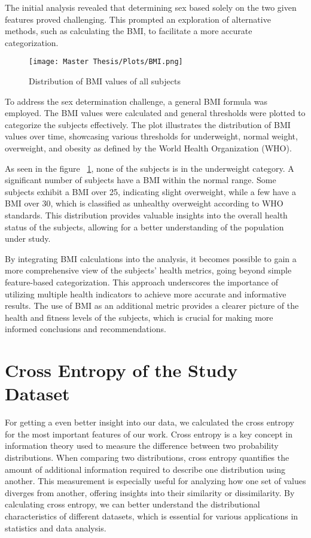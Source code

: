 The initial analysis revealed that determining sex based solely on the two given features proved challenging. This prompted an exploration of alternative methods, such as calculating the BMI, to facilitate a more accurate categorization.

\FloatBarrier
\begin{figure}[h!]
\centering
\texttt{[image: Master Thesis/Plots/BMI.png]}
\caption{Distribution of BMI values of all subjects}
\label{fig:distBMI}
\end{figure}
\FloatBarrier

To address the sex determination challenge, a general BMI formula was employed. The BMI values were calculated and general thresholds were plotted to categorize the subjects effectively. The plot illustrates the distribution of BMI values over time, showcasing various thresholds for underweight, normal weight, overweight, and obesity as defined by the World Health Organization (WHO).

As seen in the figure ~\ref{fig:distBMI}, none of the subjects is in the underweight category. A significant number of subjects have a BMI within the normal range. Some subjects exhibit a BMI over 25, indicating slight overweight, while a few have a BMI over 30, which is classified as unhealthy overweight according to WHO standards. This distribution provides valuable insights into the overall health status of the subjects, allowing for a better understanding of the population under study.

By integrating BMI calculations into the analysis, it becomes possible to gain a more comprehensive view of the subjects' health metrics, going beyond simple feature-based categorization. This approach underscores the importance of utilizing multiple health indicators to achieve more accurate and informative results. The use of BMI as an additional metric provides a clearer picture of the health and fitness levels of the subjects, which is crucial for making more informed conclusions and recommendations.

\section{Cross Entropy of the Study Dataset}

For getting a even better insight into our data, we calculated the cross entropy for the most important features of our work. Cross entropy is a key concept in information theory used to measure the difference between two probability distributions. When comparing two distributions, cross entropy quantifies the amount of additional information required to describe one distribution using another. This measurement is especially useful for analyzing how one set of values diverges from another, offering insights into their similarity or dissimilarity. By calculating cross entropy, we can better understand the distributional characteristics of different datasets, which is essential for various applications in statistics and data analysis.

